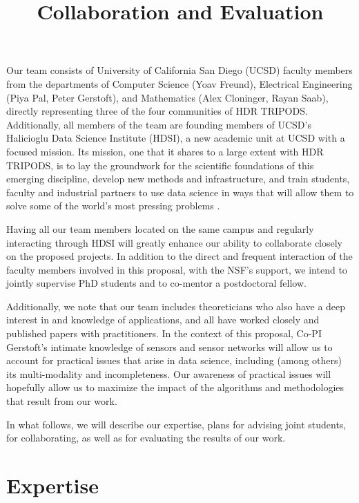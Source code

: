 \documentclass{article}
\title{Collaboration and Evaluation}
\begin{document}
Our team consists of University of California San Diego (UCSD) faculty members from the departments of Computer Science (Yoav Freund), Electrical Engineering (Piya Pal, Peter Gerstoft), and Mathematics (Alex Cloninger, Rayan Saab), directly representing three of the four communities of HDR TRIPODS.  Additionally, all members of the team are founding members of UCSD's Halicioglu Data Science Institute (HDSI), a new academic unit at UCSD with a focused mission. Its mission, one that it shares to a large extent with HDR TRIPODS, is to lay the groundwork for the scientific foundations of this emerging discipline, develop new methods and infrastructure, and train students, faculty and industrial partners to use data science in ways that will allow them to solve some of the world’s most pressing problems \cite{the HDSI website}. 

Having all our team members located on the same campus and regularly interacting through HDSI will greatly enhance our ability to collaborate closely on the proposed projects. In addition to the direct and frequent interaction of the faculty members involved in this proposal, with the NSF's support, we intend to jointly supervise PhD students and to co-mentor a postdoctoral fellow. 

Additionally, we note that our team includes theoreticians who also have a deep interest in and knowledge of applications, and all  have worked closely and published papers with practitioners. In the context of this proposal, Co-PI Gerstoft's intimate knowledge of sensors and sensor networks will allow us to account for practical issues that arise in data science, including (among others) its multi-modality and incompleteness. Our awareness of practical issues will hopefully allow us to maximize the impact of the algorithms and methodologies that result from our work.  

In what follows, we will describe our expertise, plans for advising joint students, for collaborating, as well as for evaluating the results of our work.  
 
\section{Expertise}

\end{document}

